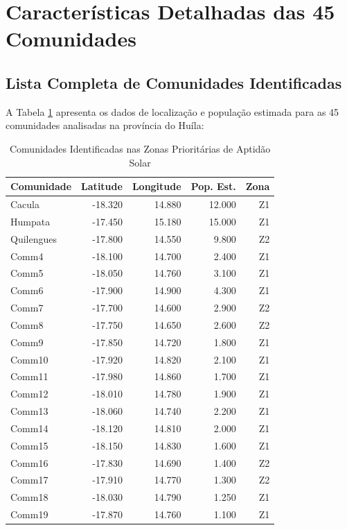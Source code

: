 \documentclass[12pt, a4paper]{article}
\begin{document}
\section{Características Detalhadas das 45 Comunidades}

\subsection{Lista Completa de Comunidades Identificadas}

A Tabela \ref{tab:communities} apresenta os dados de localização e população estimada para as 45 comunidades analisadas na província do Huíla:

\begin{table}[H]
\centering
\caption{Comunidades Identificadas nas Zonas Prioritárias de Aptidão Solar}
\label{tab:communities}
\footnotesize
\begin{tabular}{|l|r|r|r|r|}
\hline
\textbf{Comunidade} & \textbf{Latitude} & \textbf{Longitude} & \textbf{Pop. Est.} & \textbf{Zona} \\
\hline
Cacula & -18.320 & 14.880 & 12.000 & Z1 \\
Humpata & -17.450 & 15.180 & 15.000 & Z1 \\
Quilengues & -17.800 & 14.550 & 9.800 & Z2 \\
Comm4 & -18.100 & 14.700 & 2.400 & Z1 \\
Comm5 & -18.050 & 14.760 & 3.100 & Z1 \\
Comm6 & -17.900 & 14.900 & 4.300 & Z1 \\
Comm7 & -17.700 & 14.600 & 2.900 & Z2 \\
Comm8 & -17.750 & 14.650 & 2.600 & Z2 \\
Comm9 & -17.850 & 14.720 & 1.800 & Z1 \\
Comm10 & -17.920 & 14.820 & 2.100 & Z1 \\
Comm11 & -17.980 & 14.860 & 1.700 & Z1 \\
Comm12 & -18.010 & 14.780 & 1.900 & Z1 \\
Comm13 & -18.060 & 14.740 & 2.200 & Z1 \\
Comm14 & -18.120 & 14.810 & 2.000 & Z1 \\
Comm15 & -18.150 & 14.830 & 1.600 & Z1 \\
Comm16 & -17.830 & 14.690 & 1.400 & Z2 \\
Comm17 & -17.910 & 14.770 & 1.300 & Z2 \\
Comm18 & -18.030 & 14.790 & 1.250 & Z1 \\
Comm19 & -17.870 & 14.760 & 1.100 & Z1 \\

\end{tabular}
\end{table}
\end{document}
